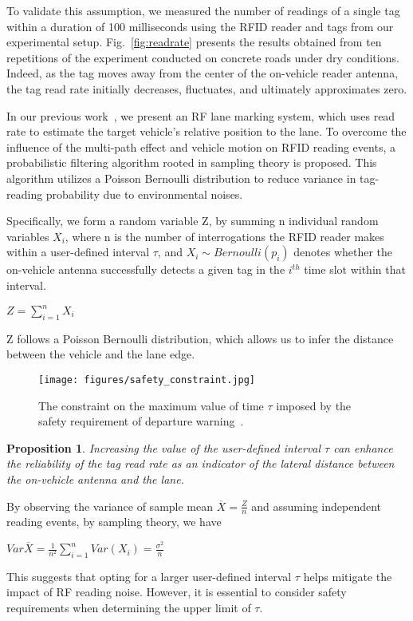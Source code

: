 \documentclass[lettersize,journal]{IEEEtran}
\newtheorem{prop}{Proposition}
\begin{document}
To validate this assumption, we measured the number of readings of a single tag within a duration of 100 milliseconds using the RFID reader and tags from our experimental setup. Fig.~\ref{fig:readrate} presents the results obtained from ten repetitions of the experiment conducted on concrete roads under dry conditions. Indeed, as the tag moves away from the center of the on-vehicle reader antenna, the tag read rate initially decreases, fluctuates, and ultimately approximates zero.

In our previous work~\cite{suo2023rf}, we present an RF lane marking system, which uses read rate to estimate the target vehicle's relative position to the lane. To overcome the influence of the multi-path effect and vehicle motion on RFID reading events, a probabilistic filtering algorithm rooted in sampling theory is proposed. This algorithm utilizes a Poisson Bernoulli distribution to reduce variance in tag-reading probability due to environmental noises.

Specifically, we form a random variable Z, by summing n individual random variables $X_i$, where n is the number of interrogations the RFID reader makes within a user-defined interval $\tau$, and $X_i \sim Bernoulli(p_i)$ denotes whether the on-vehicle antenna successfully detects a given tag in the $i^{th}$ time slot within that interval. 
\begin{center}
$Z = \sum_{i=1}^n X_i$
\end{center}  
Z follows a Poisson Bernoulli distribution, which allows us to infer the distance between the vehicle and the lane edge. 

\begin{figure}[tb!]
\centerline{\texttt{[image: figures/safety\_constraint.jpg]}}
\caption{The constraint on the maximum value of time $\tau$ imposed by the safety requirement of departure warning~\cite{suo2023rf}.}
\label{fig:safety_constraint}
\end{figure}

\begin{prop}\label{prop_tau_min}
Increasing the value of the user-defined interval $\tau$ can enhance the reliability of the tag read rate as an indicator of the lateral distance between the on-vehicle antenna and the lane.
\end{prop}

By observing the variance of sample mean $\overline{X}=\frac{Z}{n}$ and assuming independent reading events, by sampling theory, we have
\begin{center}
$Var\overline{X} = \frac{1}{n^2}\sum_{i=1}^nVar(X_i)=\frac{\sigma^2}{n} $
\end{center}
This suggests that opting for a larger user-defined interval $\tau$ helps mitigate the impact of RF reading noise. However, it is essential to consider safety requirements when determining the upper limit of $\tau$.
\end{document}
